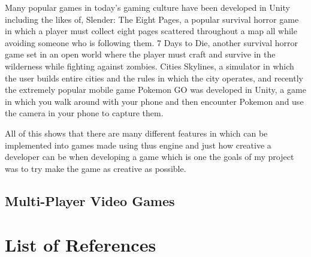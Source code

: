 \documentclass[10pt,a4paperpaper,openright]{book}
\begin{document}
Many popular games in today's gaming culture have been developed in
Unity including the likes of, Slender: The Eight Pages, a popular
survival horror game in which a player must collect eight pages
scattered throughout a map all while avoiding someone who is following
them. 7 Days to Die, another survival horror game set in an open world
where the player must craft and survive in the wilderness while fighting
against zombies. Cities Skylines, a simulator in which the user builds
entire cities and the rules in which the city operates, and recently the
extremely popular mobile game Pokemon GO was developed in Unity, a game
in which you walk around with your phone and then encounter Pokemon and
use the camera in your phone to capture them.

All of this shows that there are many different features in which can be
implemented into games made using thus engine and just how creative a
developer can be when developing a game which is one the goals of my
project was to try make the game as creative as possible.

\section{Multi-Player Video Games}\label{multi-player-video-games}

\backmatter

\chapter{List of References}\label{list-of-references}
\end{document}
